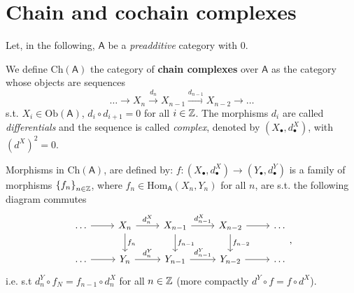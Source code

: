 \section{Chain and cochain complexes}
Let, in the following, $\mathsf{A}$ be a \textit{preadditive} category with $0$.

\begin{defn}
	We define $\mathrm{Ch}(\mathsf{A})$ the category of \textbf{chain complexes} over $\mathsf{A}$
	as the category whose objects are sequences
	\begin{equation}
	\ldots \to X_n \xrightarrow{d_n} X_{n-1}
	\xrightarrow{d_{n-1}} X_{n-2} \to \ldots
	\end{equation} 
	s.t. $X_i \in \mathrm{Ob} \left(\mathsf{A}\right)$, $d_i \circ d_{i+1} = 0$ for all $i \in \mathbb{Z}$.
	The morphisms $d_i$ are called \textit{differentials} and the sequence is called \textit{complex},
	denoted by $\left( X_{\bullet}, d^X_{\bullet} \right)$, with $\left( d^X \right)^2 = 0$.

	Morphisms in $\mathrm{Ch}(\mathsf{A})$, are defined by:
	$f:\left(X_{\bullet}, d^X_{\bullet}\right) \to \left(Y_{\bullet}, d^Y_{\bullet}\right)$
	is a family of morphisms $\left\{ f_n \right\}_{n \in \mathbb{Z}}$, where
	$f_n \in \mathrm{Hom}_{\mathsf{A}} \left( X_n, Y_n \right)$ for all $n$,
	are s.t. the following diagram commutes
	\begin{equation}
	\begin{tikzcd}
		\ldots \arrow[r, "", rightarrow] &
		X_n \arrow[r, "d^X_n", rightarrow] \arrow[d, "f_n", rightarrow] &
		X_{n-1} \arrow[r, "d^X_{n-1}", rightarrow] \arrow[d, "f_{n-1}", rightarrow] &
		X_{n-2} \arrow[r, "", rightarrow] \arrow[d, "f_{n-2}", rightarrow] &
		\ldots \\
		\ldots \arrow[r, "", rightarrow] &
		Y_n \arrow[r, "d^Y_n", rightarrow]&
		Y_{n-1} \arrow[r, "d^Y_{n-1}", rightarrow] &
		Y_{n-2} \arrow[r, "", rightarrow] &
		\ldots
	\end{tikzcd}
	,\end{equation} 
	i.e. s.t $d^Y_n \circ f_N = f_{n-1} \circ d^X_n$ for all $n \in \mathbb{Z}$
	(more compactly $d^Y \circ f = f \circ d^X$).
\end{defn}

